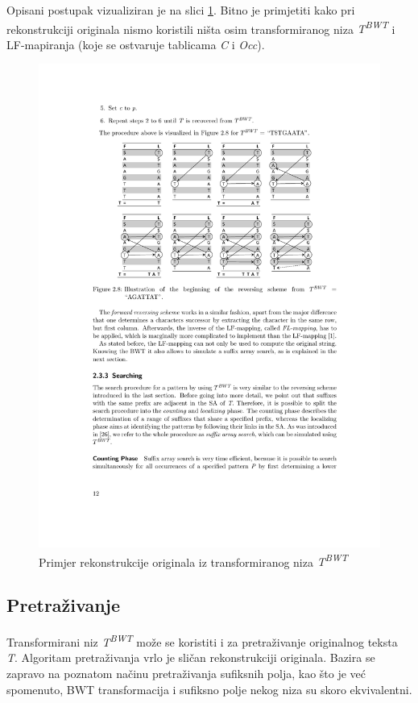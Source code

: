 \documentclass[times, utf8, seminar, numeric]{fer}
\begin{document}
Opisani postupak vizualiziran je na slici \ref{fig:lf_reconstruct}. Bitno je primjetiti kako pri
rekonstrukciji originala nismo koristili ništa osim transformiranog niza \textit{T\textsuperscript{BWT}}
i LF-mapiranja (koje se ostvaruje tablicama \textit{C} i \textit{Occ}).

\begin{figure}[!htb]
\centering
\includegraphics{fig/lf_reconstruct.pdf}
\caption{Primjer rekonstrukcije originala iz transformiranog niza \textit{T\textsuperscript{BWT}}}
\label{fig:lf_reconstruct}
\end{figure}

\subsection{Pretraživanje}
\label{sec:pretrazivanje}

Transformirani niz \textit{T\textsuperscript{BWT}} može se koristiti i za pretraživanje
originalnog teksta \textit{T}. Algoritam pretraživanja vrlo je sličan rekonstrukciji
originala. Bazira se zapravo na poznatom načinu pretraživanja sufiksnih polja, kao
što je već spomenuto, BWT transformacija i sufiksno polje nekog niza su skoro ekvivalentni.
\end{document}

